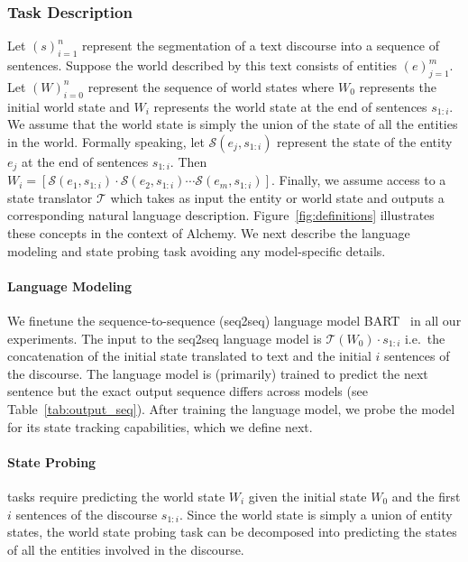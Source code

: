 \documentclass[12pt]{thesis-umich}[thesis]
\begin{document}
\subsubsection{Task Description}
Let $(s)_{i=1}^n$ represent the segmentation of a text discourse into a sequence of sentences.
Suppose the world described by this text consists of entities $(e)_{j=1}^m$.
Let $(W)_{i=0}^n$ represent the sequence of world states where $W_0$ represents the initial world state and $W_i$ represents the world state at the end of sentences $s_{1:i}$.
 We assume that the world state is simply the union of the state of all the entities in the world.
Formally speaking, let $\mathcal{S}(e_j, s_{1:i})$ represent the state of the entity $e_j$ at the end of sentences $s_{1:i}$. Then $W_i = [\mathcal{S}(e_1, s_{1:i}) \cdot \mathcal{S}(e_2, s_{1:i}) \cdots \mathcal{S}(e_m, s_{1:i})]$. Finally, we assume access to a state translator $\mathcal{T}$ which takes as input the entity or world state and outputs a corresponding natural language description.
Figure~\ref{fig:definitions} illustrates these concepts in the context of Alchemy. 
We next describe the language modeling and state probing task avoiding any model-specific details.  

\paragraph{Language Modeling} 
We finetune the sequence-to-sequence (seq2seq) language model  BART~\cite{lewis-etal-2020-bart} in all our experiments. 
The input to the seq2seq language model is $\mathcal{T}(W_0) \cdot s_{1:i}$ i.e.\ the concatenation of the initial state translated to text and the initial $i$ sentences of the discourse.
The language model is (primarily) trained to predict the next sentence but the exact output sequence differs across models (see Table~\ref{tab:output_seq}). 
After training the language model, we probe the model for its state tracking capabilities, which we define next. 

\paragraph{State Probing} tasks require predicting the world state $W_i$ given the initial state $W_0$ and the first $i$ sentences of the discourse $s_{1:i}$. Since the world state is simply a union of entity states, the world state probing task can be decomposed into predicting the states of all the entities involved in the discourse.   
\end{document}
